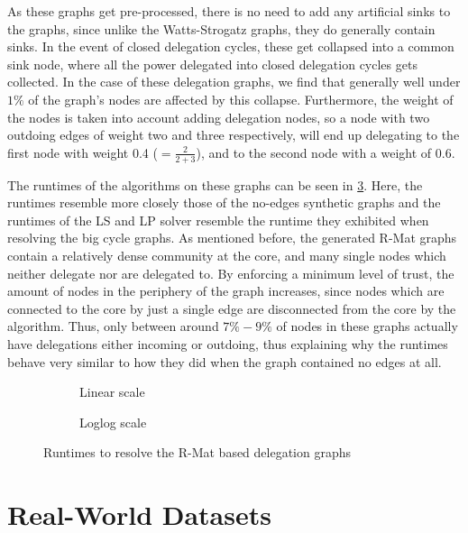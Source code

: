 As these graphs get pre-processed, there is no need to add any artificial sinks to the graphs, since unlike the Watts-Strogatz graphs, they do generally contain sinks. In the event of closed delegation cycles, these get collapsed into a common sink node, where all the power delegated into closed delegation cycles gets collected. In the case of these delegation graphs, we find that generally well under $1\%$ of the graph's nodes are affected by this collapse. Furthermore, the weight of the nodes is taken into account adding delegation nodes, so a node with two outdoing edges of weight two and three respectively, will end up delegating to the first node with weight 0.4 ($= \frac{2}{2+3}$), and to the second node with a weight of 0.6.

The runtimes of the algorithms on these graphs can be seen in \cref{fig:rmat}. Here, the runtimes resemble more closely those of the no-edges synthetic graphs and the runtimes of the LS and LP solver resemble the runtime they exhibited when resolving the big cycle graphs. As mentioned before, the generated R-Mat graphs contain a relatively dense community at the core, and many single nodes which neither delegate nor are delegated to. By enforcing a minimum level of trust, the amount of nodes in the periphery of the graph increases, since nodes which are connected to the core by just a single edge are disconnected from the core by the algorithm. Thus, only between around $7\% - 9\%$ of nodes in these graphs actually have delegations either incoming or outdoing, thus explaining why the runtimes behave very similar to how they did when the graph contained no edges at all.

\begin{figure}[t]
    \centering
    \begin{subfigure}[t]{0.45\textwidth}
        \centering
        \caption{Linear scale}
        \label{subfig:rmat_linear}
    \end{subfigure}
    \hfill
    \begin{subfigure}[t]{0.45\textwidth}
        \centering
        \caption{Loglog scale}
        \label{subfig:rmat_loglog}
    \end{subfigure}
    \caption{Runtimes to resolve the R-Mat based delegation graphs}
    \label{fig:rmat}
\end{figure}


\section{Real-World Datasets}

